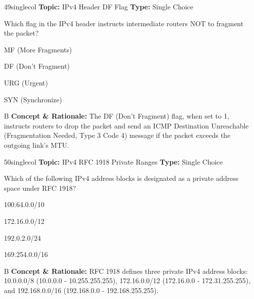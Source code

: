 \begin{qcard}{49}{singlecol}
\textcolor{darkslate!75}{\small\textbf{Topic:} IPv4 Header DF Flag \hfill \textbf{Type:} Single Choice}\vspace{0.4em}\par
Which flag in the IPv4 header instructs intermediate routers NOT to fragment the packet?
\begin{qoptions}
\item MF (More Fragments)
\item DF (Don't Fragment)
\item URG (Urgent)
\item SYN (Synchronize)
\end{qoptions}
\end{qcard}
\nopagebreak
\begin{explainbox}{B}
\textbf{Concept \& Rationale:} The DF (Don't Fragment) flag, when set to 1, instructs routers to drop the packet and send an ICMP Destination Unreachable (Fragmentation Needed, Type 3 Code 4) message if the packet exceeds the outgoing link's MTU.
\end{explainbox}

\begin{qcard}{50}{singlecol}
\textcolor{darkslate!75}{\small\textbf{Topic:} IPv4 RFC 1918 Private Ranges \hfill \textbf{Type:} Single Choice}\vspace{0.4em}\par
Which of the following IPv4 address blocks is designated as a private address space under RFC 1918?
\begin{qoptions}
\item 100.64.0.0/10
\item 172.16.0.0/12
\item 192.0.2.0/24
\item 169.254.0.0/16
\end{qoptions}
\end{qcard}
\nopagebreak
\begin{explainbox}{B}
\textbf{Concept \& Rationale:} RFC 1918 defines three private IPv4 address blocks: 10.0.0.0/8 (10.0.0.0 - 10.255.255.255), 172.16.0.0/12 (172.16.0.0 - 172.31.255.255), and 192.168.0.0/16 (192.168.0.0 - 192.168.255.255).
\end{explainbox}

